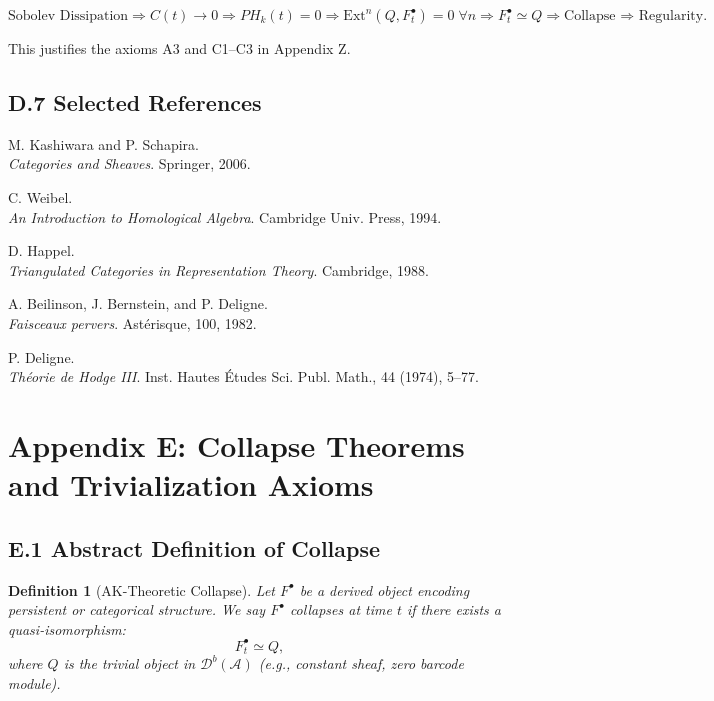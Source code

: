 \documentclass[11pt]{article}
\newtheorem{definition}[theorem]{Definition}
\begin{document}
\[
\text{Sobolev Dissipation}
\Rightarrow
C(t) \to 0
\Rightarrow
PH_k(t) = 0
\Rightarrow
\mathrm{Ext}^n(Q, F^\bullet_t) = 0 \; \forall n
\Rightarrow
F^\bullet_t \simeq Q
\Rightarrow
\text{Collapse ⇒ Regularity}.
\]

This justifies the axioms A3 and C1–C3 in Appendix Z.

\subsection*{D.7 Selected References}

\begin{thebibliography}{9}

M. Kashiwara and P. Schapira.\\
\textit{Categories and Sheaves}. Springer, 2006.

C. Weibel.\\
\textit{An Introduction to Homological Algebra}. Cambridge Univ. Press, 1994.

D. Happel.\\
\textit{Triangulated Categories in Representation Theory}. Cambridge, 1988.

A. Beilinson, J. Bernstein, and P. Deligne.\\
\textit{Faisceaux pervers}. Astérisque, 100, 1982.

P. Deligne.\\
\textit{Théorie de Hodge III}. Inst. Hautes Études Sci. Publ. Math., 44 (1974), 5–77.

\end{thebibliography}



\section*{Appendix E: Collapse Theorems and Trivialization Axioms}

\subsection*{E.1 Abstract Definition of Collapse}

\begin{definition}[AK-Theoretic Collapse]
Let $F^\bullet$ be a derived object encoding persistent or categorical structure.  
We say $F^\bullet$ \emph{collapses} at time $t$ if there exists a quasi-isomorphism:
\[
F^\bullet_t \simeq Q,
\]
where $Q$ is the trivial object in $\mathcal{D}^b(\mathcal{A})$ (e.g., constant sheaf, zero barcode module).
\end{definition}
\end{document}
